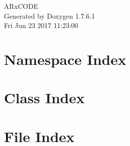 \documentclass[a4paper]{book}
\begin{document}
\begin{titlepage}
\vspace*{7cm}
\begin{center}
{\Large \-A\-Rx\-C\-O\-D\-E }\\
\vspace*{1cm}
{\large \-Generated by Doxygen 1.7.6.1}\\
\vspace*{0.5cm}
{\small Fri Jun 23 2017 11:23:00}\\
\end{center}
\end{titlepage}
\clearemptydoublepage
{}
\tableofcontents
\clearemptydoublepage
{}
\chapter{\-Namespace \-Index}

\chapter{\-Class \-Index}

\chapter{\-File \-Index}

\end{document}
